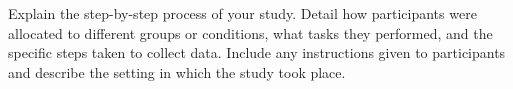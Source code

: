 Explain the step-by-step process of your study. Detail how participants were allocated to different groups or conditions, what tasks they performed, and the specific steps taken to collect data. Include any instructions given to participants and describe the setting in which the study took place.